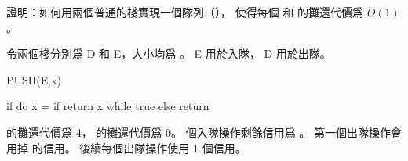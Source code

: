 \startEXERCISE
證明：如何用兩個普通的棧實現一個隊列（），
使得每個  和  的攤還代價爲 $O(1)$。
\stopEXERCISE

\startANSWER
令兩個棧分別爲 D 和 E，大小均爲 。 E 用於入隊， D 用於出隊。

\startCLRSCODE
PUSH(E,x)
\stopCLRSCODE

\startCLRSCODE
if 
	do
		x = 
		if 
			return x
	while true
else
	return 
\stopCLRSCODE

 的攤還代價爲 4，  的攤還代價爲 0。
  個入隊操作剩餘信用爲 。
第一個出隊操作會用掉  的信用。
後續每個出隊操作使用 1 個信用。
\stopANSWER

